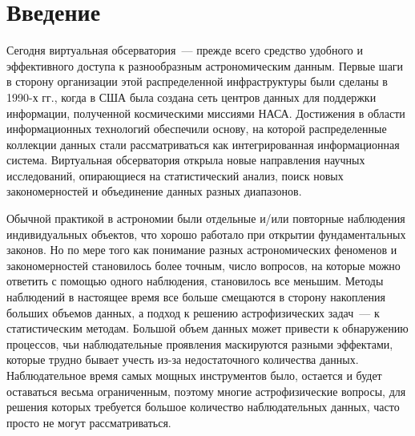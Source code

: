 \vspace*{2pt}



      \thispagestyle{headings}

      \begin{multicols}{2}

            \label{st\stat}

\section{Введение}
        
      Сегодня виртуальная обсерватория~--- прежде всего средство удобного и эффективного 
доступа к разнообразным астрономическим данным. Первые шаги в сторону организации 
этой распределенной инфраструктуры были сделаны в 1990-х гг., когда в 
США была создана сеть центров данных для поддержки информации, полученной 
космическими миссиями НАСА. Достижения в области информационных технологий 
обеспечили основу, на которой распределенные коллекции данных стали рассматриваться 
как интегрированная информационная система. Виртуальная обсерватория открыла новые 
направления научных исследований, опирающиеся на статистический анализ, поиск новых 
закономерностей и объединение данных разных диапазонов.
      
      Обычной практикой в астрономии были отдельные и/или повторные наблюдения 
индивидуальных объектов, что хорошо работало при открытии фундаментальных законов. 
Но по мере того как понимание разных астрономических феноменов и закономерностей 
становилось более точным, чис\-ло вопросов, на которые можно ответить с по\-мощью одного 
наблюдения, становилось все меньшим. Методы наблюдений в настоящее время все больше 
смещаются в сторону накопления больших объемов данных, а подход к решению 
астрофизических задач~--- к статистическим методам. Большой объем данных может 
привести к обнаружению процессов, чьи наблюдательные проявления маскируются разными 
эффектами, которые трудно бывает учесть из-за недостаточного количества данных. 
Наблюдательное время самых мощных инструментов было, остается и будет оставаться 
весьма ограниченным, поэтому многие астрофизические вопросы, для решения которых 
требуется большое количество наблюдательных данных, час\-то прос\-то не могут 
рассматриваться. 
      

\end{multicols}
